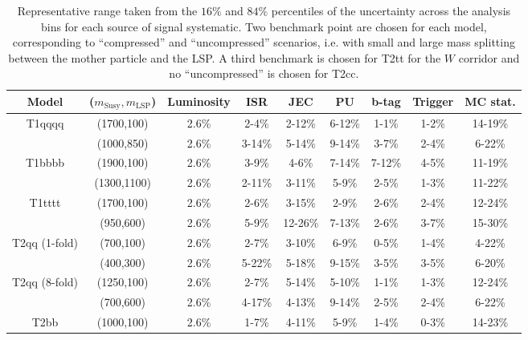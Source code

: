 \begin{table}[h!]
    \scriptsize
    \caption{
        Representative range taken from the $16\%$ and $84\%$ percentiles of the
        uncertainty across the analysis bins for each source of signal
        systematic. Two benchmark point are chosen for each model, corresponding
        to ``compressed'' and ``uncompressed'' scenarios, i.e. with small and
        large mass splitting between the mother particle and the LSP. A third
        benchmark is chosen for T2tt for the $W$ corridor and no
        ``uncompressed'' is chosen for T2cc.
    }
    \label{tab:sig-systematics-LLP}
    \centering
    \begin{tabular}{ ccccccccc }
        \hline \hline
        Model & ($m_{\mathrm{Susy}},m_{\mathrm{LSP}}$) & Luminosity & ISR & JEC & PU & b-tag & Trigger & MC stat. \\ \hline
        \multirow{2}{*}{T1qqqq}
            & (1700,100) & 2.6\% & 2-4\%  & 2-12\% & 6-12\% & 1-1\% & 1-2\% & 14-19\% \\
            & (1000,850) & 2.6\% & 3-14\% & 5-14\% & 9-14\% & 3-7\% & 2-4\% & 6-22\%  \\
        \hline
        \multirow{2}{*}{T1bbbb}
            & (1900,100)  & 2.6\% & 3-9\%  & 4-6\%  & 7-14\% & 7-12\% & 4-5\% & 11-19\% \\
            & (1300,1100) & 2.6\% & 2-11\% & 3-11\% & 5-9\%  & 2-5\%  & 1-3\% & 11-22\% \\
        \hline
        \multirow{2}{*}{T1tttt}
            & (1700,100) & 2.6\% & 2-6\% & 3-15\%  & 2-9\%  & 2-6\% & 2-4\% & 12-24\% \\
            & (950,600)  & 2.6\% & 5-9\% & 12-26\% & 7-13\% & 2-6\% & 3-7\% & 15-30\% \\
        \hline
        \multirow{2}{*}{T2qq (1-fold)}
            & (700,100) & 2.6\% & 2-7\%  & 3-10\% & 6-9\%  & 0-5\% & 1-4\% & 4-22\% \\
            & (400,300) & 2.6\% & 5-22\% & 5-18\% & 9-15\% & 3-5\% & 3-5\% & 6-20\% \\
        \hline
        \multirow{2}{*}{T2qq (8-fold)}
            & (1250,100) & 2.6\% & 2-7\%  & 5-14\% & 5-10\% & 1-1\% & 1-3\% & 12-24\% \\
            & (700,600)  & 2.6\% & 4-17\% & 4-13\% & 9-14\% & 2-5\% & 2-4\% & 6-22\%  \\
        \hline
        \multirow{2}{*}{T2bb}
            & (1000,100) & 2.6\% & 1-7\%  & 4-11\% & 5-9\%  & 1-4\% & 0-3\% & 14-23\% \\

\end{tabular}
\end{table}
